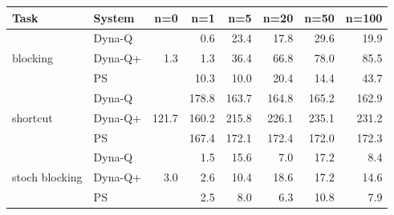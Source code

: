 \begin{tabular}{llrrrrrr}
\toprule
Task & System & n=0 & n=1 & n=5 & n=20 & n=50 & n=100 \\
\midrule
\multirow{3}{*}{blocking} & Dyna-Q & \multirow{3}{*}{1.3} & 0.6 & 23.4 & 17.8 & 29.6 & 19.9 \\
 & Dyna-Q+ &  & 1.3 & 36.4 & 66.8 & 78.0 & 85.5 \\
 & PS &  & 10.3 & 10.0 & 20.4 & 14.4 & 43.7 \\
\midrule
\multirow{3}{*}{shortcut} & Dyna-Q & \multirow{3}{*}{121.7} & 178.8 & 163.7 & 164.8 & 165.2 & 162.9 \\
 & Dyna-Q+ &  & 160.2 & 215.8 & 226.1 & 235.1 & 231.2 \\
 & PS &  & 167.4 & 172.1 & 172.4 & 172.0 & 172.3 \\
\midrule
\multirow{3}{*}{stoch blocking} & Dyna-Q & \multirow{3}{*}{3.0} & 1.5 & 15.6 & 7.0 & 17.2 & 8.4 \\
 & Dyna-Q+ &  & 2.6 & 10.4 & 18.6 & 17.2 & 14.6 \\
 & PS &  & 2.5 & 8.0 & 6.3 & 10.8 & 7.9 \\
\bottomrule
\end{tabular}

